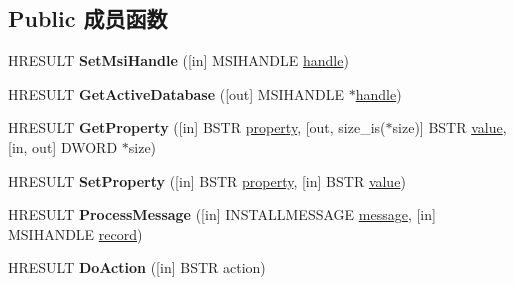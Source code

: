 \subsection*{Public 成员函数}
\begin{DoxyCompactItemize}
\item 
\mbox{\label{interface_i_wine_msi_remote_package_ab3b293280d0892f2b9426f6537ae1836}} 
H\+R\+E\+S\+U\+LT {\bfseries Set\+Msi\+Handle} (\mbox{[}in\mbox{]} M\+S\+I\+H\+A\+N\+D\+LE \hyperlink{structhandle}{handle})
\item 
\mbox{\label{interface_i_wine_msi_remote_package_a9512a58845faea102a2b09196f9df60f}} 
H\+R\+E\+S\+U\+LT {\bfseries Get\+Active\+Database} (\mbox{[}out\mbox{]} M\+S\+I\+H\+A\+N\+D\+LE $\ast$\hyperlink{structhandle}{handle})
\item 
\mbox{\label{interface_i_wine_msi_remote_package_a6a4855f46283eabf58054d11bc0bb1e5}} 
H\+R\+E\+S\+U\+LT {\bfseries Get\+Property} (\mbox{[}in\mbox{]} B\+S\+TR \hyperlink{structproperty}{property}, \mbox{[}out, size\+\_\+is($\ast$size)\mbox{]} B\+S\+TR \hyperlink{unionvalue}{value}, \mbox{[}in, out\mbox{]} D\+W\+O\+RD $\ast$size)
\item 
\mbox{\label{interface_i_wine_msi_remote_package_a52f0d3f463501621b5d0771c611f83f3}} 
H\+R\+E\+S\+U\+LT {\bfseries Set\+Property} (\mbox{[}in\mbox{]} B\+S\+TR \hyperlink{structproperty}{property}, \mbox{[}in\mbox{]} B\+S\+TR \hyperlink{unionvalue}{value})
\item 
\mbox{\label{interface_i_wine_msi_remote_package_a2d16b5bbed8f182d8f240928d33b6dc9}} 
H\+R\+E\+S\+U\+LT {\bfseries Process\+Message} (\mbox{[}in\mbox{]} I\+N\+S\+T\+A\+L\+L\+M\+E\+S\+S\+A\+GE \hyperlink{structmessage}{message}, \mbox{[}in\mbox{]} M\+S\+I\+H\+A\+N\+D\+LE \hyperlink{structrecord}{record})
\item 
\mbox{\label{interface_i_wine_msi_remote_package_af9321ca9a071d50c785076c799826ad3}} 
H\+R\+E\+S\+U\+LT {\bfseries Do\+Action} (\mbox{[}in\mbox{]} B\+S\+TR action)
\item 
\mbox{\label{interface_i_wine_msi_remote_package_acb0eda78924e43b0f7fbd7dd34f72a52}} 

\end{DoxyCompactItemize}
